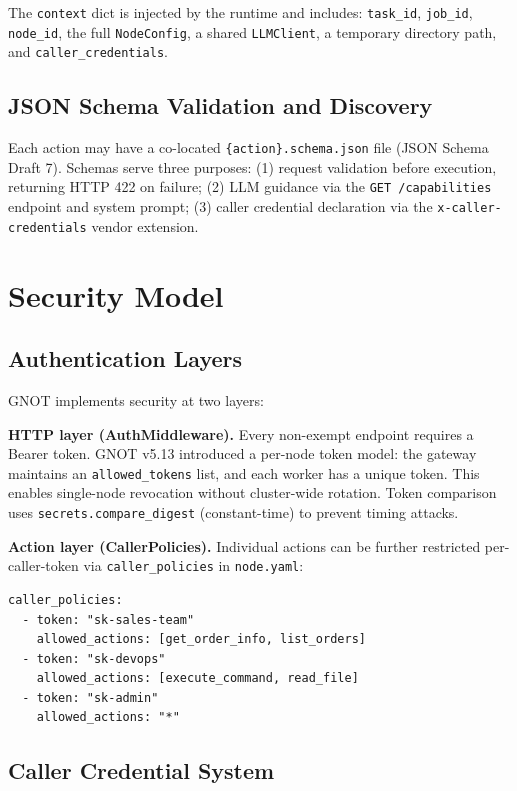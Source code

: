 \documentclass[10pt,twocolumn]{article}
\begin{document}
The \texttt{context} dict is injected by the runtime and includes:
\texttt{task\_id}, \texttt{job\_id}, \texttt{node\_id}, the full
\texttt{NodeConfig}, a shared \texttt{LLMClient}, a temporary directory
path, and \texttt{caller\_credentials}.

\subsection{JSON Schema Validation and Discovery}

Each action may have a co-located \texttt{\{action\}.schema.json} file
(JSON Schema Draft 7). Schemas serve three purposes: (1) request
validation before execution, returning HTTP 422 on failure; (2) LLM
guidance via the \texttt{GET /capabilities} endpoint and system prompt;
(3) caller credential declaration via the \texttt{x-caller-credentials}
vendor extension.

\section{Security Model}
\label{sec:security}

\subsection{Authentication Layers}

GNOT implements security at two layers:

\textbf{HTTP layer (AuthMiddleware).} Every non-exempt endpoint requires
a Bearer token. GNOT v5.13 introduced a per-node token model: the
gateway maintains an \texttt{allowed\_tokens} list, and each worker has
a unique token. This enables single-node revocation without
cluster-wide rotation. Token comparison uses \texttt{secrets.compare\_digest}
(constant-time) to prevent timing attacks.

\textbf{Action layer (CallerPolicies).} Individual actions can be
further restricted per-caller-token via \texttt{caller\_policies} in
\texttt{node.yaml}:

\begin{lstlisting}[caption={Action-level authorization example}]
caller_policies:
  - token: "sk-sales-team"
    allowed_actions: [get_order_info, list_orders]
  - token: "sk-devops"
    allowed_actions: [execute_command, read_file]
  - token: "sk-admin"
    allowed_actions: "*"
\end{lstlisting}

\subsection{Caller Credential System}
\end{document}
